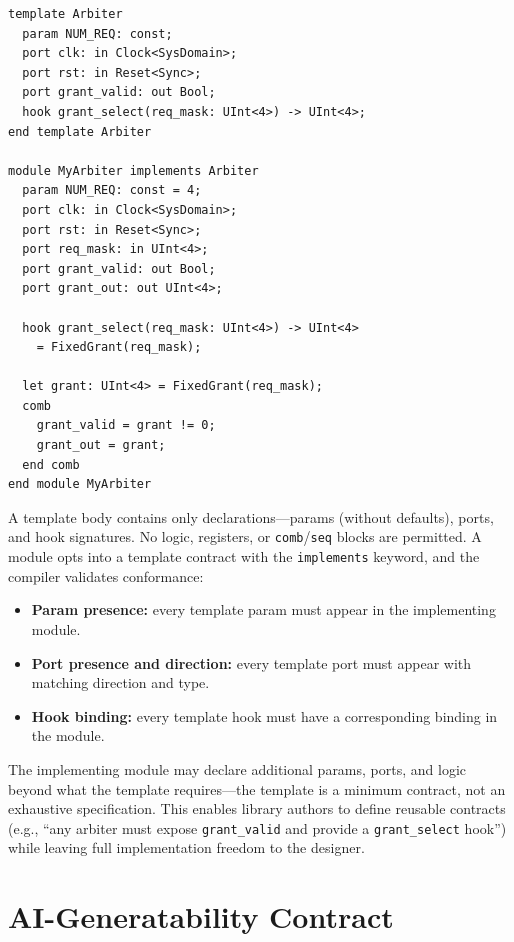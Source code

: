 \documentclass[11pt,twocolumn]{article}
\begin{document}
\begin{lstlisting}[language=Arch,caption={Template declaration and implementation},label={lst:template}]
template Arbiter
  param NUM_REQ: const;
  port clk: in Clock<SysDomain>;
  port rst: in Reset<Sync>;
  port grant_valid: out Bool;
  hook grant_select(req_mask: UInt<4>) -> UInt<4>;
end template Arbiter

module MyArbiter implements Arbiter
  param NUM_REQ: const = 4;
  port clk: in Clock<SysDomain>;
  port rst: in Reset<Sync>;
  port req_mask: in UInt<4>;
  port grant_valid: out Bool;
  port grant_out: out UInt<4>;

  hook grant_select(req_mask: UInt<4>) -> UInt<4>
    = FixedGrant(req_mask);

  let grant: UInt<4> = FixedGrant(req_mask);
  comb
    grant_valid = grant != 0;
    grant_out = grant;
  end comb
end module MyArbiter
\end{lstlisting}

A template body contains only declarations---params (without defaults), ports, and hook signatures. No logic, registers, or \texttt{comb}/\texttt{seq} blocks are permitted. A module opts into a template contract with the \texttt{implements} keyword, and the compiler validates conformance:

\begin{itemize}
\item \textbf{Param presence:} every template param must appear in the implementing module.
\item \textbf{Port presence and direction:} every template port must appear with matching direction and type.
\item \textbf{Hook binding:} every template hook must have a corresponding binding in the module.
\end{itemize}

The implementing module may declare additional params, ports, and logic beyond what the template requires---the template is a minimum contract, not an exhaustive specification. This enables library authors to define reusable contracts (e.g., ``any arbiter must expose \texttt{grant\_valid} and provide a \texttt{grant\_select} hook'') while leaving full implementation freedom to the designer.

\section{AI-Generatability Contract}\label{sec:ai}
\end{document}
